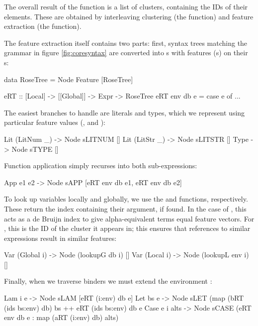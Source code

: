The overall result of the  function is a list of clusters, containing the IDs of their elements. These are obtained by interleaving clustering (the  function) and feature extraction (the  function).

The feature extraction itself contains two parts: first, syntax trees matching the grammar in figure \ref{fig:coresyntax} are converted into s with features (s) on their s:

\begin{haskell}
data RoseTree = Node Feature [RoseTree]

eRT :: [Local] -> [[Global]] -> Expr -> RoseTree
eRT env db e = case e of
  ...
\end{haskell}

The easiest branches to handle are literals and types, which we represent using particular feature values (,  and ):

\begin{haskell}
  Lit (LitNum _) -> Node sLITNUM []
  Lit (LitStr _) -> Node sLITSTR []
  Type           -> Node sTYPE   []
\end{haskell}

Function application simply recurses into both sub-expressions:

\begin{haskell}
  App e1 e2 -> Node sAPP [eRT env db e1,
                          eRT env db e2]
\end{haskell}

To look up variables locally and globally, we use the  and  functions, respectively. These return the index containing their argument, if found. In the case of , this acts as a de Bruijn index to give alpha-equivalent terms equal feature vectors. For , this is the ID of the cluster it appears in; this ensures that references to similar expressions result in similar features:

\begin{haskell}
  Var (Global i) -> Node (lookupG db  i) []
  Var (Local  i) -> Node (lookupL env i) []
\end{haskell}

Finally, when we traverse binders we must extend the environment :

\begin{haskell}
  Lam  i  e     -> Node sLAM [eRT (i:env) db e]
  Let  bs e     -> Node sLET (map (bRT (ids bs:env) db) bs ++
                                   eRT (ids bs:env) db  e
  Case e i alts -> Node sCASE (eRT    env  db  e :
                          map (aRT (i:env) db) alts)
\end{haskell}

